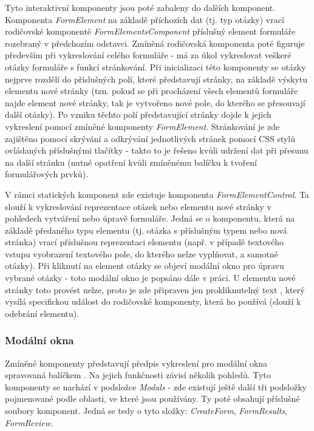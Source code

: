 		Tyto interaktivní komponenty jsou poté zabaleny do dalších komponent. Komponenta \textit{FormElement} na základě příchozích dat (tj. typ otázky) vrací rodičovské komponentě \textit{FormElementsComponent} příslušný element formuláře rozebraný v předchozím odstavci. Zmíněná rodičovská komponenta poté figuruje především při vykreslování celého formuláře - má za úkol vykreslovat veškeré otázky formuláře s funkcí stránkování. Při inicializaci této komponenty se otázky nejprve rozdělí do příslušných polí, které představují stránky, na základě výskytu elementu nové stránky (tzn. pokud se při procházení všech elementů formuláře najde element nové stránky, tak je vytvořeno nové pole, do kterého se přesouvají další otázky). Po vzniku těchto polí představující stránky dojde k jejich vykreslení pomocí zmíněné komponenty \textit{FormElement}. Stránkování je zde zajištěno pomocí skrývání a odkrývání jednotlivých stránek pomocí CSS stylů ovládaných příslušnými tlačítky - takto to je řešeno kvůli udržení dat při přesunu na další stránku (nutné opatření kvůli zmíněnému balíčku k tvoření formulářových prvků).
		
		V rámci statických komponent zde existuje komponenta \textit{FormElementControl}. Ta slouží k vykreslování reprezentace otázek nebo elementu nové stránky v pohledech vytváření nebo úpravě formuláře. Jedná se o komponentu, která na základě předaného typu elementu (tj. otázka s příslušným typem nebo nová stránka) vrací příslušnou reprezentaci elementu (např. v případě textového vstupu vyobrazení textového pole, do kterého nelze vyplňovat, a samotné otázky). Při kliknutí na element otázky se objeví modální okno pro úpravu vybrané otázky - toto modální okno je popsáno dále v práci. U elementu nové stránky toto provést nelze, proto je zde připraven jen prokliknutelný text , který vysílá specifickou událost do rodičovské komponenty, která ho používá (slouží k odebrání elementu).
	
		\subsubsection{Modální okna} %
		Zmíněné komponenty představují předpis vykreslení pro modální okna spravovaná balíčkem . Na jejich funkčnosti závisí několik pohledů. Tyto komponenty se nachází v podsložce \textit{Modals} - zde existují ještě další tři podsložky pojmenované podle oblasti, ve které jsou používány. Ty poté obsahují příslušné soubory komponent. Jedná se tedy o tyto složky: \textit{CreateForm}, \textit{FormResults}, \textit{FormReview}. 
		
